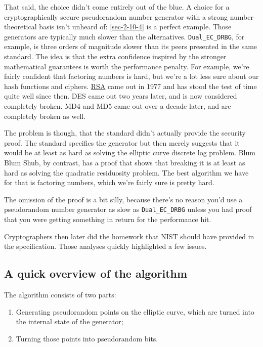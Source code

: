 \documentclass[11pt,ebook,table,dvipsnames]{memoir}
\begin{document}
That said, the choice didn't come entirely out of the blue. A choice
for a cryptographically secure pseudorandom number generator with a
strong number-theoretical basis isn't unheard of: \ref{sec-2-10-4} is a
perfect example. Those generators are typically much slower than the
alternatives. \verb~Dual_EC_DRBG~, for example, is three orders of
magnitude slower than its peers presented in the same standard. The
idea is that the extra confidence inspired by the stronger
mathematical guarantees is worth the performance penalty. For example,
we're fairly confident that factoring numbers is hard, but we're a lot
less sure about our hash functions and ciphers. \hyperref[RSA]{RSA} came out in 1977
and has stood the test of time quite well since then. \gls{DES} came
out two years later, and is now considered completely broken. MD4 and
MD5 came out over a decade later, and are completely broken as well.

The problem is though, that the standard didn't actually provide the
security proof. The standard specifies the generator but then merely
suggests that it would be at least as hard as solving the elliptic
curve discrete log problem. Blum Blum Shub, by contrast, has a proof
that shows that breaking it is at least as hard as solving the
quadratic residuosity problem. The best algorithm we have for that is
factoring numbers, which we're fairly sure is pretty hard.

The omission of the proof is a bit silly, because there's no reason
you'd use a pseudorandom number generator as slow as \verb~Dual_EC_DRBG~
unless you had proof that you were getting something in return for the
performance hit.

Cryptographers then later did the homework that NIST should have
provided in the specification\cite{ecdrbg1}\cite{ecdrbg2}. Those
analyses quickly highlighted a few issues.
\subsection{A quick overview of the algorithm}
\label{sec-2-10-5-2}

The algorithm consists of two parts:

\begin{enumerate}
\item Generating pseudorandom points on the elliptic curve, which are
turned into the internal state of the generator;
\item Turning those points into pseudorandom bits.
\end{enumerate}
\end{document}
